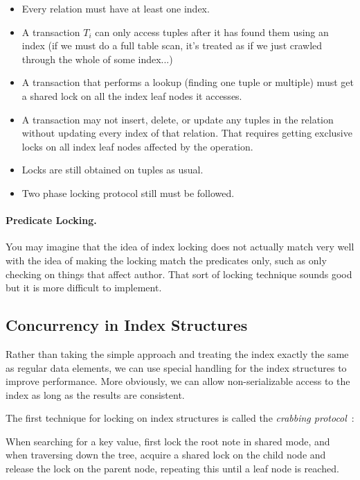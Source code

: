\begin{itemize}
	\item Every relation must have at least one index.
	\item A transaction $T_{i}$ can only access tuples after it has found them using an index (if we must do a full table scan, it's treated as if we just crawled through the whole of some index...)
	\item A transaction that performs a lookup (finding one tuple or multiple) must get a shared lock on all the index leaf nodes it accesses.
	\item A transaction may not insert, delete, or update any tuples in the relation without updating every index of that relation. That requires getting exclusive locks on all index leaf nodes affected by the operation. 
	\item Locks are still obtained on tuples as usual.
	\item Two phase locking protocol still must be followed. 
\end{itemize}


\paragraph{Predicate Locking.} You may imagine that the idea of index locking does not actually match very well with the idea of making the locking match the predicates only, such as only checking on things that affect author. That sort of locking technique sounds good but it is more difficult to implement. 

\subsection*{Concurrency in Index Structures}

Rather than taking the simple approach and treating the index exactly the same as regular data elements, we can use special handling for the index structures to improve performance. More obviously, we can allow non-serializable access to the index as long as the results are consistent. 

The first technique for locking on index structures is called the \textit{crabbing protocol}~\cite{dsc}:

When searching for a key value, first lock the root note in shared mode, and when traversing down the tree, acquire a shared lock on the child node and release the lock on the parent node, repeating this until a leaf node is reached.

